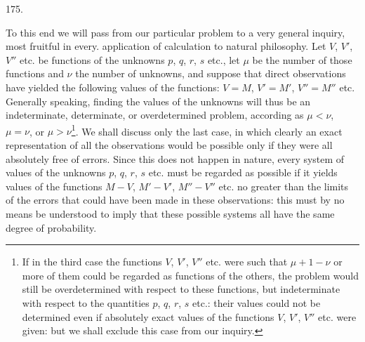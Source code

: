 \par{}\medskip
\begin{center}\hypertarget{native-246-article175}{}175.\end{center}
To this end we will pass from our particular problem to a very general inquiry, most fruitful in every. application of calculation to natural philosophy. Let $V$, $V'$, $V''$ etc. be functions of the unknowns $p$, $q$, $r$, $s$ etc., let $\mu$ be the number of those functions and $\nu$ the number of unknowns, and suppose that direct observations have yielded the following values of the functions: $V=M$, $V'=M'$, $V''=M''$ etc. Generally speaking, finding the values of the unknowns will thus be an indeterminate, determinate, or overdetermined problem, according as $\mu<\nu$, $\mu=\nu$, or $\mu>\nu$\footnote{If in the third case the functions $V$, $V'$, $V''$ etc. were such that $\mu+1-\nu$ or more of them could be regarded as functions of the others, the problem would still be overdetermined with respect to these functions, but indeterminate with respect to the quantities $p$, $q$, $r$, $s$ etc.: their values could not be determined even if absolutely exact values of the functions $V$, $V'$, $V''$ etc. were given: but we shall exclude this case from our inquiry.}.
We shall discuss only the last case, in which clearly an exact representation of all the observations would be possible only if they were all absolutely free of errors. Since this does not happen in nature, every system of values of the unknowns $p$, $q$, $r$, $s$ etc. must be regarded as possible if it yields values of the functions $M-V$, $M'-V'$, $M''-V''$ etc. no greater than the limits of the errors that could have been made in these observations: this must by no means be understood to imply that these possible systems all have the same degree of probability.

